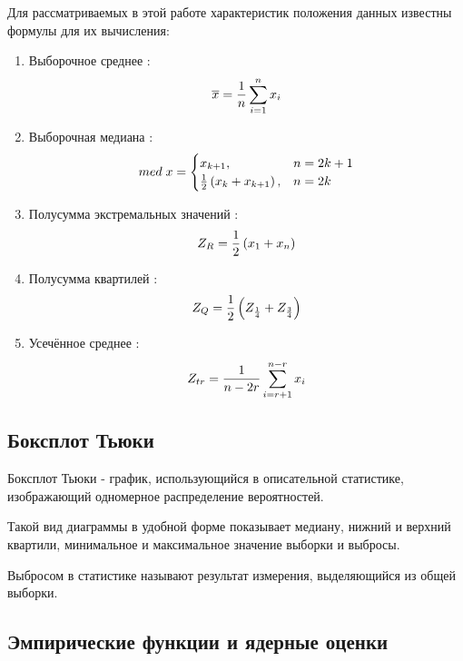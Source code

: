 \documentclass[a4]{article}
\begin{document}
Для рассматриваемых в этой работе характеристик положения данных известны формулы для их вычисления:

\begin{enumerate}
\item Выборочное среднее \cite{average}:
\begin{equation}\label{eqn:average}
\overline{x} = \frac{1}{n}\sum_{i=1}^n x_i \hfill  
\end{equation}
\item Выборочная медиана \cite{med}:
\begin{equation}
med\; x = \begin{cases}
x_{k+1}, & n = 2k+1\\
\frac{1}{2}\left(x_k+x_{k+1}\right), & n = 2k
\end{cases} \hfill  \label{eqn:med}
\end{equation}
\item Полусумма экстремальных значений \cite{mean_extr}:
\begin{equation}
Z_R = \frac{1}{2}\left(x_1+x_n\right) \hfill  \label{eqn:mean_extr}
\end{equation}
\item Полусумма квартилей \cite{quartiles}:
\begin{equation}
Z_Q = \frac{1}{2}\left(Z_{\frac{1}{4}}+Z_{\frac{3}{4}}\right) \hfill  \label{eqn:quartiles}
\end{equation}
\item Усечённое среднее \cite{cut_mean}:
\begin{equation}
Z_{tr} = \frac{1}{n - 2r}\sum_{i=r+1}^{n-r} x_i \hfill  \label{eqn:cut_mean}
\end{equation}
\end{enumerate}


\subsection{Боксплот Тьюки}

Боксплот Тьюки - график, использующийся в описательной статистике, изображающий одномерное распределение вероятностей.

Такой вид диаграммы в удобной форме показывает медиану, нижний и верхний квартили, минимальное и максимальное значение выборки и выбросы.

Выбросом в статистике называют результат измерения, выделяющийся из общей выборки.

\subsection{Эмпирические функции и ядерные оценки}
\end{document}
